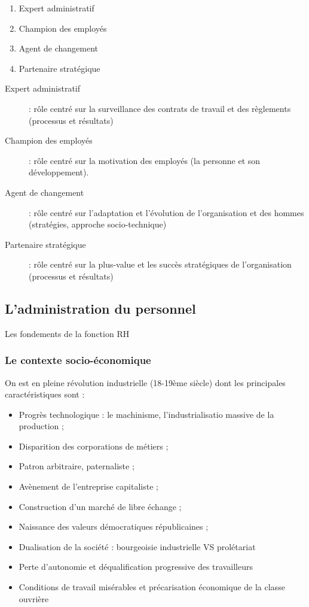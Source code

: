 \documentclass[12pt]{article}
\begin{document}
	  \begin{enumerate}
	   \item Expert administratif
	   \item Champion des employés
	   \item Agent de changement
	   \item Partenaire stratégique
	  \end{enumerate}

	  
	  \begin{description}
	   \item[Expert administratif] : rôle centré sur la surveillance des contrats de travail et des règlements (processus et résultats)
	   \item[Champion des employés] : rôle centré sur la motivation des employés (la personne et son développement).
	   \item[Agent de changement] : rôle centré sur l'adaptation et l'évolution de l'organisation et des hommes (stratégies, approche socio-technique)
	   \item[Partenaire stratégique] : rôle centré sur la plus-value et les succès stratégiques de l'organisation (processus et résultats)
	  \end{description}
	  
	\subsection{L'administration du personnel}
	Les fondements de la fonction RH
	  \subsubsection{Le contexte socio-économique}
	  On est en pleine révolution industrielle (18-19ème siècle) dont les principales caractéristiques sont :
	  
	  \begin{itemize}
	   \item Progrès technologique : le machinisme, l'industrialisatio massive de la production ;
	   \item Disparition des corporations de métiers ;
	   \item Patron arbitraire, paternaliste ;
	   \item Avènement de l'entreprise capitaliste ;
	   \item Construction d'un marché de libre échange ;
	   \item Naissance des valeurs démocratiques républicaines ;
	   \item Dualisation de la société : bourgeoisie industrielle VS prolétariat
	   \item Perte d'autonomie et déqualification progressive des travailleurs
	   \item Conditions de travail misérables et précarisation économique de la classe ouvrière
	  \end{itemize}
	  
\end{document}
